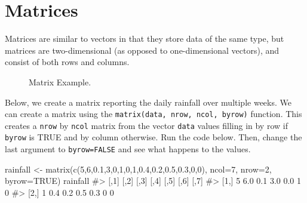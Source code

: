\documentclass[
  letterpaper,
]{krantz}
\makeatletter
\newenvironment{Shaded}{\begin{snugshade}}{\end{snugshade}}
\newcommand{\AttributeTok}[1]{\textcolor[rgb]{0.40,0.45,0.13}{#1}}
\newcommand{\CommentTok}[1]{\textcolor[rgb]{0.37,0.37,0.37}{#1}}
\newcommand{\ConstantTok}[1]{\textcolor[rgb]{0.56,0.35,0.01}{#1}}
\newcommand{\DecValTok}[1]{\textcolor[rgb]{0.68,0.00,0.00}{#1}}
\newcommand{\FloatTok}[1]{\textcolor[rgb]{0.68,0.00,0.00}{#1}}
\newcommand{\FunctionTok}[1]{\textcolor[rgb]{0.28,0.35,0.67}{#1}}
\newcommand{\NormalTok}[1]{\textcolor[rgb]{0.00,0.23,0.31}{#1}}
\newcommand{\OtherTok}[1]{\textcolor[rgb]{0.00,0.23,0.31}{#1}}
\newenvironment{kframe}{%
\medskip{}
\setlength{\fboxsep}{.8em}
 \def\at@end@of@kframe{}%
 \ifinner\ifhmode%
  \def\at@end@of@kframe{\end{minipage}}%
  \begin{minipage}{\columnwidth}%
 \fi\fi%
 \def\FrameCommand##1{\hskip\@totalleftmargin \hskip-\fboxsep
 \colorbox{shadecolor}{##1}\hskip-\fboxsep
     \hskip-\linewidth \hskip-\@totalleftmargin \hskip\columnwidth}%
 \MakeFramed {\advance\hsize-\width
   \@totalleftmargin\z@ \linewidth\hsize
   \@setminipage}}%
 {\par\unskip\endMakeFramed%
 \at@end@of@kframe}
\renewenvironment{Shaded}{\begin{kframe}}{\end{kframe}}
\makeatother
\begin{document}
\section{Matrices}\label{matrices}

Matrices are similar to vectors in that they store data of the same
type, but matrices are two-dimensional (as opposed to one-dimensional
vectors), and consist of both rows and columns.

\begin{figure}


\caption{\label{fig-matrix}Matrix Example.}

\end{figure}%

Below, we create a matrix reporting the daily rainfall over multiple
weeks. We can create a matrix using the
\texttt{matrix(data,\ nrow,\ ncol,\ byrow)} function. This creates a
\texttt{nrow} by \texttt{ncol} matrix from the vector \texttt{data}
values filling in by row if \texttt{byrow} is TRUE and by column
otherwise. Run the code below. Then, change the last argument to
\texttt{byrow=FALSE} and see what happens to the values.

\begin{Shaded}
\begin{Highlighting}[]
\NormalTok{rainfall }\OtherTok{\textless{}{-}} \FunctionTok{matrix}\NormalTok{(}\FunctionTok{c}\NormalTok{(}\DecValTok{5}\NormalTok{,}\DecValTok{6}\NormalTok{,}\FloatTok{0.1}\NormalTok{,}\DecValTok{3}\NormalTok{,}\DecValTok{0}\NormalTok{,}\DecValTok{1}\NormalTok{,}\DecValTok{0}\NormalTok{,}\DecValTok{1}\NormalTok{,}\FloatTok{0.4}\NormalTok{,}\FloatTok{0.2}\NormalTok{,}\FloatTok{0.5}\NormalTok{,}\FloatTok{0.3}\NormalTok{,}\DecValTok{0}\NormalTok{,}\DecValTok{0}\NormalTok{), }
                   \AttributeTok{ncol=}\DecValTok{7}\NormalTok{, }\AttributeTok{nrow=}\DecValTok{2}\NormalTok{, }\AttributeTok{byrow=}\ConstantTok{TRUE}\NormalTok{)}
\NormalTok{rainfall}
\CommentTok{\#\textgreater{}      [,1] [,2] [,3] [,4] [,5] [,6] [,7]}
\CommentTok{\#\textgreater{} [1,]    5  6.0  0.1  3.0  0.0    1    0}
\CommentTok{\#\textgreater{} [2,]    1  0.4  0.2  0.5  0.3    0    0}
\end{Highlighting}
\end{Shaded}
\end{document}
